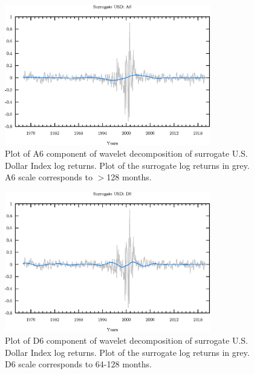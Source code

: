 \begin{figure}
\begin{center}
\includegraphics[width=0.8\textwidth]{./code/plot/surrogate_usd_wr_A6.eps}
\caption{Plot of A6 component of wavelet decomposition of surrogate U.S. Dollar Index log returns. 
	Plot of the surrogate log returns in grey. A6 scale corresponds to $>$128 months.}
\end{center}
\label{fig:s-usd-wr-a6}
\end{figure}

\begin{figure}
\begin{center}
\includegraphics[width=0.8\textwidth]{./code/plot/surrogate_usd_wr_D6.eps}
\caption{Plot of D6 component of wavelet decomposition of surrogate U.S. Dollar Index log returns. 
	Plot of the surrogate log returns in grey. D6 scale corresponds to 64-128 months.}
\end{center}
\label{fig:s-usd-wr-d6}
\end{figure}

